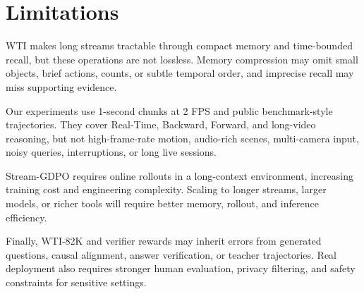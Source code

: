 \section*{Limitations}

WTI makes long streams tractable through compact memory and time-bounded recall, but these operations are not lossless.
Memory compression may omit small objects, brief actions, counts, or subtle temporal order, and imprecise recall may miss supporting evidence.

Our experiments use 1-second chunks at 2 FPS and public benchmark-style trajectories.
They cover Real-Time, Backward, Forward, and long-video reasoning, but not high-frame-rate motion, audio-rich scenes, multi-camera input, noisy queries, interruptions, or long live sessions.

Stream-GDPO requires online rollouts in a long-context environment, increasing training cost and engineering complexity.
Scaling to longer streams, larger models, or richer tools will require better memory, rollout, and inference efficiency.

Finally, WTI-82K and verifier rewards may inherit errors from generated questions, causal alignment, answer verification, or teacher trajectories.
Real deployment also requires stronger human evaluation, privacy filtering, and safety constraints for sensitive settings.
